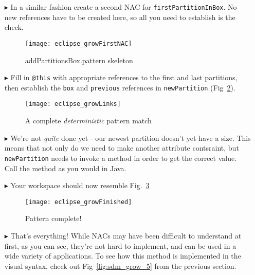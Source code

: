 \begin{itemize}
\vspace{0.5cm}

\item[$\blacktriangleright$] In a similar fashion create a second NAC for \texttt{firstPartitionInBox}. No new references have to be created here, so all you
need to establish is the check.

\begin{figure}[htp]
\begin{center}
  \texttt{[image: eclipse\_growFirstNAC]}
  \caption{addPartitionsBox.pattern skeleton}
  \label{fig:growPattSkel}
\end{center}
\end{figure}

\clearpage

\item[$\blacktriangleright$] Fill in \texttt{@this} with appropriate references to the first and last partitions, then establish the \texttt{box} and
\texttt{previous} references in \texttt{newPartition} (Fig~\ref{fig:growAllLinks}).

\vspace{0.5cm}

\begin{figure}[htp]
\begin{center}
  \texttt{[image: eclipse\_growLinks]}
  \caption{A complete \emph{deterministic} pattern match}
  \label{fig:growAllLinks}
\end{center}
\end{figure}

\item[$\blacktriangleright$] We're not \emph{quite} done yet - our newest partition doesn't yet have a size. This means that not only do we need to make
another attribute contsraint, but \texttt{newPartition} needs to invoke a method in order to get the correct value. Call the method as you would in Java. 

\vspace{0.5cm}

\item[$\blacktriangleright$] Your workspace should now resemble Fig.~\ref{fig:patternComplete}

\begin{figure}[htp]
\begin{center}
  \texttt{[image: eclipse\_growFinished]}
  \caption{Pattern complete!}
  \label{fig:patternComplete}
\end{center}
\end{figure}

\vspace{0.5cm}

\item[$\blacktriangleright$] That's everything! While NACs may have been difficult to understand at first, as you can see, they're not hard to implement, and
can be used in a wide variety of applications. To see how this method is implemented in the visual syntax, check out Fig~\ref{fig:sdm_grow_5} from the previous
section.

\end{itemize}